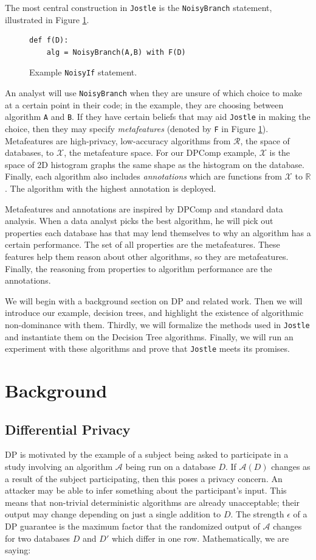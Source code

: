 \documentclass[11pt]{article}
\newcommand{\Jostle}{\texttt{Jostle}}
\begin{document}
The most central construction in \Jostle{} is the \texttt{NoisyBranch} statement, illustrated in Figure \ref{fig:1}.
\begin{figure}
\begin{lstlisting}
def f(D):
    alg = NoisyBranch(A,B) with F(D)
\end{lstlisting}
\caption{Example \texttt{NoisyIf} statement.}
\label{fig:1}
\end{figure}
An analyst will use \texttt{NoisyBranch} when they are unsure of which choice to make at a certain point in their code; in the example, they are choosing between algorithm \texttt{A} and \texttt{B}. If they have certain beliefs that may aid \Jostle{} in making the choice, then they may specify \emph{metafeatures} (denoted by \texttt{F} in Figure \ref{fig:1}).  Metafeatures are high-privacy, low-accuracy algorithms from $\mathcal{R}$, the space of databases, to $\mathcal{X}$, the metafeature space. For our DPComp example, $\mathcal{X}$ is the space of 2D histogram graphs the same shape as the histogram on the database. Finally, each algorithm also includes \emph{annotations} which are functions from $\mathcal{X}$ to $\mathbb{R}$. The algorithm with the highest annotation is deployed.

Metafeatures and annotations are inspired by DPComp and standard data analysis. When a data analyst picks the best algorithm, he will pick out properties each database has that may lend themselves to why an algorithm has a certain performance. The set of all properties are the metafeatures. These features help them reason about other algorithms, so they are metafeatures. Finally, the reasoning from properties to algorithm performance are the annotations.

We will begin with a background section on DP and related work. Then we will introduce our example, decision trees, and highlight the existence of algorithmic non-dominance with them. Thirdly, we will formalize the methods used in \Jostle{} and instantiate them on the Decision Tree algorithms. Finally, we will run an experiment with these algorithms and prove that \Jostle{} meets its promises.

\section{Background}
\subsection{Differential Privacy}
DP is motivated by the example of a subject being asked to participate in a study involving an algorithm $\mathcal{A}$ being run on a database $D$. If $\mathcal{A}(D)$ changes as a result of the subject participating, then this poses a privacy concern. An attacker may be able to infer something about the participant's input. This means that non-trivial deterministic algorithms are already unacceptable; their output may change depending on just a single addition to $D$. The strength $\epsilon$ of a DP guarantee is the maximum factor that the randomized output of $\mathcal{A}$ changes for two databases $D$ and $D'$ which differ in one row. Mathematically, we are saying:
\end{document}
